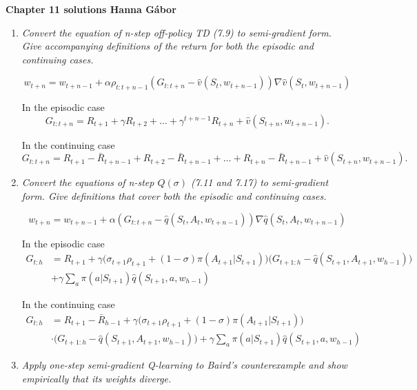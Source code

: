 \documentclass[12pt,a4paper]{article}
\begin{document}
\textbf{Chapter 11 solutions  \hfill Hanna Gábor}

\begin{enumerate}
  \item \textit{Convert the equation of n-step off-policy TD (7.9) to semi-gradient
  form. Give accompanying definitions of the return for both the episodic and
  continuing cases.}

  \[w_{t + n} = w_{t + n - 1} + \alpha \rho_{t : t + n - 1}(G_{t: t + n} - \hat{v}(S_t,
  w_{t + n - 1})) \nabla \hat{v}(S_t, w_{t + n - 1})\]

  In the episodic case
  \[G_{t : t + n} = R_{t + 1} + \gamma R_{t + 2} + \dots + \gamma^{t + n - 1} R_{t + n} +
  \hat{v}(S_{t + n}, w_{t + n - 1}).\]

  In the continuing case
  \[G_{t : t + n} = R_{t + 1} - \bar{R}_{t + n - 1} + R_{t + 2} - \bar{R}_{t + n - 1}
  + \dots + R_{t + n} - \bar{R}_{t + n - 1} + \hat{v}(S_{t + n}, w_{t + n - 1}).\]

  \item \textit{Convert the equations of n-step $Q(\sigma)$ (7.11
  and 7.17) to semi-gradient form. Give definitions that cover both the
  episodic and continuing cases.}

  \[w_{t + n} = w_{t + n - 1} + \alpha (G_{t: t+ n}
  - \hat{q}(S_t, A_t, w_{t + n - 1})) \nabla\hat{q}(S_t, A_t, w_{t + n - 1})\]

  In the episodic case
  \begin{align*}
    G_{t: h} &= R_{t + 1} + \gamma\Big(\sigma_{t + 1}\rho_{t + 1}
    + (1 - \sigma) \pi(A_{t + 1}|S_{t + 1})\Big)
    \Big(G_{t + 1: h} - \hat{q}(S_{t + 1}, A_{t + 1}, w_{h - 1})\Big)\\
    &+ \gamma \sum\limits_a \pi(a|S_{t + 1}) \hat{q}(S_{t + 1}, a, w_{h - 1})
  \end{align*}

  In the continuing case
  \begin{align*}
    G_{t: h} &= R_{t + 1} - \bar{R}_{h - 1} + \gamma\Big(\sigma_{t + 1}\rho_{t + 1}
    + (1 - \sigma) \pi(A_{t + 1}|S_{t + 1})\Big)\\
    &\cdot \Big(G_{t + 1: h} - \hat{q}(S_{t + 1}, A_{t + 1}, w_{h - 1})\Big)
    + \gamma \sum\limits_a \pi(a|S_{t + 1}) \hat{q}(S_{t + 1}, a, w_{h - 1})
  \end{align*}

  \item \textit{Apply one-step semi-gradient Q-learning to Baird’s
  counterexample and show empirically that its weights diverge.}


\end{enumerate}
\end{document}
